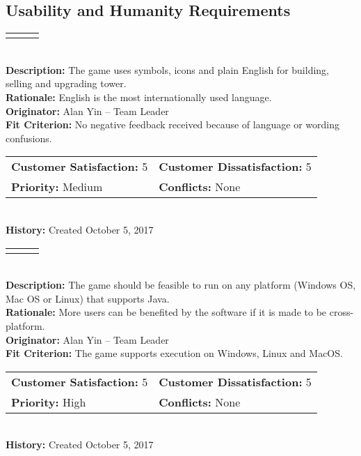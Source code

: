 \documentclass[12pt]{article}
\begin{document}
\subsection{Usability and Humanity Requirements}
\begin{reqbox}
\begin{tabular}{ccc}\color{red}{Requirement: UFR02}
\end{tabular} \\
\color{red}
\textbf{Description:} The game uses symbols, icons and plain English for building, selling and upgrading tower.\\
\textbf{Rationale:} English is the most internationally used language.\\
\color{black}
\textbf{Originator:} Alan Yin -- Team Leader \\
\textbf{Fit Criterion:} No negative feedback received because of language or wording confusions.\\
\begin{tabular}{ll}
\textbf{Customer Satisfaction:} 5 & \textbf{Customer Dissatisfaction:} 5 \\
\textbf{Priority:} Medium & \textbf{Conflicts:} None\\
\end{tabular} \\
\textbf{History:} Created October 5, 2017
\end{reqbox}


\newpage
\begin{reqbox}
\begin{tabular}{ccc}\color{red}{Requirement: UFR03}
\end{tabular} \\
\textbf{Description:} The game should be feasible to run on any platform (Windows OS, Mac OS or Linux) that supports Java.\\
\textbf{Rationale:} More users can be benefited by the software if it is made to be cross-platform.\\
\textbf{Originator:} Alan Yin -- Team Leader \\
\textbf{Fit Criterion:} The game supports execution on Windows, Linux and MacOS.\\
\begin{tabular}{ll}
\textbf{Customer Satisfaction:} 5 & \textbf{Customer Dissatisfaction:} 5 \\
\textbf{Priority:} High & \textbf{Conflicts:} None\\
\end{tabular} \\
\textbf{History:} Created October 5, 2017
\end{reqbox}
\end{document}
